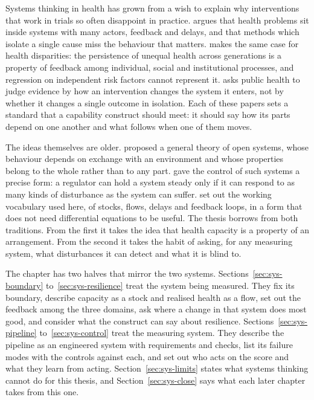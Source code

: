 Systems thinking in health has grown from a wish to explain why interventions
that work in trials so often disappoint in practice. \citet{peters_2014}
argues that health problems sit inside systems with many actors, feedback and
delays, and that methods which isolate a single cause miss the behaviour that
matters. \citet{diez_roux_2011} makes the same case for health disparities:
the persistence of unequal health across generations is a property of feedback
among individual, social and institutional processes, and regression on
independent risk factors cannot represent it. \citet{rutter_2017} asks public
health to judge evidence by how an intervention changes the system it enters,
not by whether it changes a single outcome in isolation. Each of these papers
sets a standard that a capability construct should meet: it should say how
its parts depend on one another and what follows when one of them moves.

The ideas themselves are older. \citet{vonbertalanffy_1968} proposed a general
theory of open systems, whose behaviour depends on exchange with an
environment and whose properties belong to the whole rather than to any part.
\citet{ashby_1956} gave the control of such systems a precise form: a
regulator can hold a system steady only if it can respond to as many kinds of
disturbance as the system can suffer. \citet{meadows_2008} set out the working
vocabulary used here, of stocks, flows, delays and feedback loops, in a form
that does not need differential equations to be useful. The thesis borrows
from both traditions. From the first it takes the idea that health capacity is
a property of an arrangement. From the second it takes the habit of asking,
for any measuring system, what disturbances it can detect and what it is blind
to.

The chapter has two halves that mirror the two systems.
Sections~\ref{sec:sys-boundary} to~\ref{sec:sys-resilience} treat the system
being measured. They fix its boundary, describe capacity as a stock and
realised health as a flow, set out the feedback among the three domains, ask
where a change in that system does most good, and consider what the construct
can say about resilience. Sections~\ref{sec:sys-pipeline}
to~\ref{sec:sys-control} treat the measuring system. They describe the
pipeline as an engineered system with requirements and checks, list its
failure modes with the controls against each, and set out who acts on the
score and what they learn from acting. Section~\ref{sec:sys-limits} states
what systems thinking cannot do for this thesis, and
Section~\ref{sec:sys-close} says what each later chapter takes from this one.

